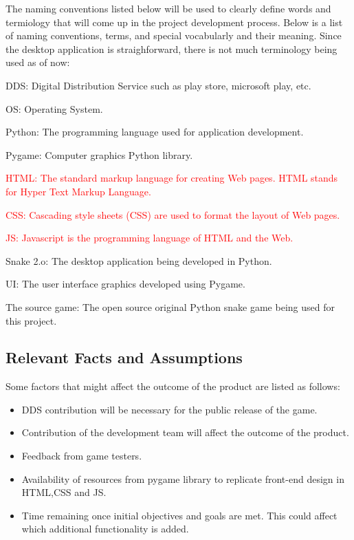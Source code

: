 \documentclass[12pt, titlepage]{article}
\begin{document}
The naming conventions listed below will be used to clearly define words and termiology that will come up in the project development process. Below is a list
of naming conventions, terms, and special vocabularly and their meaning. Since the desktop application is straighforward, there is not much terminology being
used as of now:

\begin{itemize}
\item DDS: Digital Distribution Service such as play store, microsoft play, etc.
\item OS: Operating System.
\item Python: The programming language used for application development.
\item Pygame: Computer graphics Python library.
\textcolor{red}{\item HTML: The standard markup language for creating Web pages. HTML stands for Hyper Text Markup Language.
\item CSS: Cascading style sheets (CSS) are used to format the layout of Web pages.
\item JS: Javascript is the programming language of HTML and the Web.}
\item Snake 2.o: The desktop application being developed in Python.
\item UI: The user interface graphics developed using Pygame.
\item The source game: The open source original Python snake game being used for this project.
\end{itemize}

\subsection{Relevant Facts and Assumptions}

Some factors that might affect the outcome of the product are listed as follows:
\begin{itemize}
\item DDS contribution will be necessary for the public release of the game.
\item Contribution of  the development team will affect the outcome of the product.
\item Feedback from game testers.
\item Availability of resources from pygame library to replicate front-end design in HTML,CSS and JS.
\item Time remaining once initial objectives and goals are met. This could affect which additional functionality is added.
\end{itemize}
\end{document}
